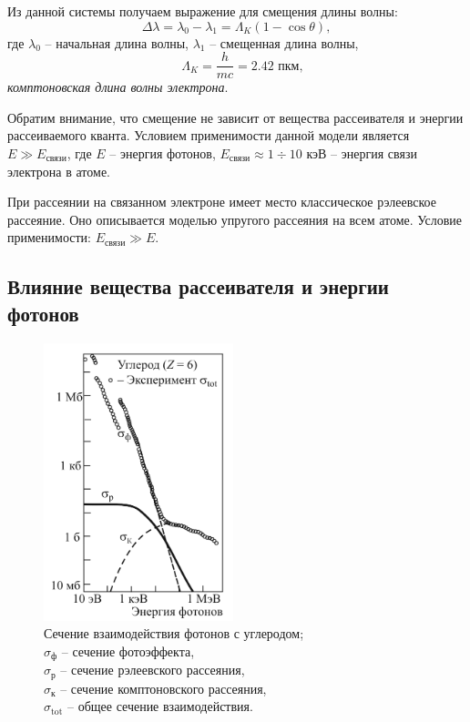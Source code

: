 \documentclass[12pt,a4paper]{article}
\begin{document}
	Из данной системы получаем выражение для смещения длины волны:
	\begin{equation}
		\Delta \lambda = \lambda_0 - \lambda_1 = \Lambda_K (1 - \cos \theta),
		\label{eq:shift_lambda}
	\end{equation}
	где $\lambda_0$ -- начальная длина волны, $\lambda_1$ -- смещенная длина волны,
	$$ \quad \Lambda_K = \frac{h}{mc} = 2.42 \text{ пкм}, $$
	\textit{комптоновская длина волны электрона}.
	
	Обратим внимание, что смещение не зависит от вещества рассеивателя и энергии рассеиваемого кванта. Условием применимости данной модели является $E \gg E_{\text{связи}}$, где $E$ -- энергия фотонов, $E_{\text{связи}} \approx 1 \div 10 \text{ кэВ}$ -- энергия связи электрона в атоме.
	
	При рассеянии на связанном электроне имеет место классическое рэлеевское рассеяние. Оно описывается моделью упругого рассеяния на всем атоме. Условие применимости: $E_{\text{связи}} \gg E$.
	
	\subsection*{Влияние вещества рассеивателя и энергии фотонов}
	
	\begin{figure}
		\caption{Сечение взаимодействия фотонов с углеродом; \\
				 $\sigma_{\text{ф}}$ -- сечение фотоэффекта, \\
				 $\sigma_{\text{р}}$ -- сечение рэлеевского рассеяния, \\
				 $\sigma_{\text{к}}$ -- сечение комптоновского рассеяния, \\
				 $\sigma_{\text{tot}}$ -- общее сечение взаимодействия.
				 }
		\label{fig:cross_section}
		\includegraphics[width=5.5cm]{res/cross_section.png}
		\vspace{-10pt}
	\end{figure} 
	
\end{document}
